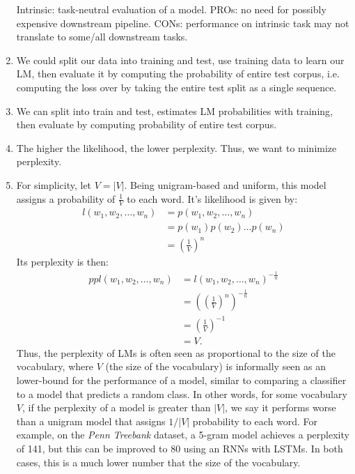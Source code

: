 \documentclass[11pt,a4paper]{article}
\begin{document}
\begin{enumerate}[label=(\alph*)]
          Intrinsic: task-neutral evaluation of a model.
          PROs: no need for possibly expensive downstream pipeline.
          CONs: performance on intrinsic task may not translate to some/all
          downstream tasks.
    \item We could split our data into training and test, use training data to
          learn our LM, then evaluate it by computing the probability of entire
          test corpus, i.e. computing the loss over by taking the entire test
          split as a single sequence.
    \item We can split into train and test, estimates LM probabilities with
          training, then evaluate by computing probability of entire test
          corpus.
    \item The higher the likelihood, the lower perplexity. Thus, we want to
          minimize perplexity.
    \item For simplicity, let $V = |V|$.
          Being unigram-based and uniform, this model assigns a probability of
          $\frac{1}{V}$ to each word.
          It's likelihood is given by:
          \begin{align*}
              l(w_1,w_2,\ldots,w_n) & = p(w_1,w_2, \ldots, w_n)     \\
                                    & = p(w_1) p(w_2) \ldots p(w_n) \\
                                    & = \left(\frac{1}{V}\right)^n
          \end{align*}
          Its perplexity is then:
          \begin{align*}
              ppl(w_1,w_2,\ldots,w_n) & = l(w_1,w_2,\ldots,w_n)^{-\frac{1}{n}}                   \\
                                      & = \left(\left(\frac{1}{V}\right)^n\right)^{-\frac{1}{n}} \\
                                      & = \left(\frac{1}{V}\right)^{-1}                          \\
                                      & = V.
          \end{align*}
          Thus, the perplexity of LMs is often seen as proportional to the size
          of the vocabulary, where $V$ (the size of the vocabulary) is informally
          seen as an lower-bound for the performance of a model, similar to
          comparing a classifier to a model that predicts a random class.
          In other words, for some vocabulary $V$, if the perplexity of a model
          is greater than $|V|$, we say it performs worse than a unigram model
          that assigns $1/|V|$ probability to each word.
          For example, on the \emph{Penn Treebank} dataset, a 5-gram model
          achieves a perplexity of 141, but this can be improved to 80 using an
          RNNs with LSTMs.
          In both cases, this is a much lower number that the size of the
          vocabulary.
\end{enumerate}
\end{document}
